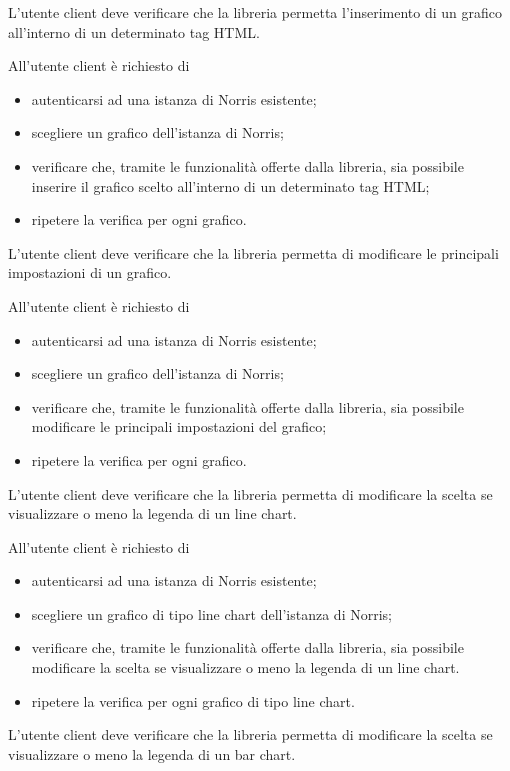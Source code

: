 	L'utente client deve verificare che la libreria permetta l'inserimento di un grafico all'interno di un determinato tag HTML.
		
		All'utente client è richiesto di
		\begin{itemize}
			\item autenticarsi ad una istanza di Norris esistente;
			\item scegliere un grafico dell'istanza di Norris;
			\item verificare che, tramite le funzionalità offerte dalla libreria, sia possibile inserire il grafico scelto all'interno di un determinato tag HTML;
			\item ripetere la verifica per ogni grafico.
		\end{itemize}

	L'utente client deve verificare che la libreria permetta di modificare le principali impostazioni di un grafico.
		
		All'utente client è richiesto di
		\begin{itemize}
			\item autenticarsi ad una istanza di Norris esistente;
			\item scegliere un grafico dell'istanza di Norris;
			\item verificare che, tramite le funzionalità offerte dalla libreria, sia possibile modificare le principali impostazioni del grafico;
			\item ripetere la verifica per ogni grafico.
		\end{itemize}

	L'utente client deve verificare che la libreria permetta di modificare la scelta se visualizzare o meno la legenda di un line chart.
		
		All'utente client è richiesto di
		\begin{itemize}
			\item autenticarsi ad una istanza di Norris esistente;
			\item scegliere un grafico di tipo line chart dell'istanza di Norris;
			\item verificare che, tramite le funzionalità offerte dalla libreria, sia possibile modificare la scelta se visualizzare o meno la legenda di un line chart.
			\item ripetere la verifica per ogni grafico di tipo line chart.
		\end{itemize}

	L'utente client deve verificare che la libreria permetta di modificare la scelta se visualizzare o meno la legenda di un bar chart.
		
